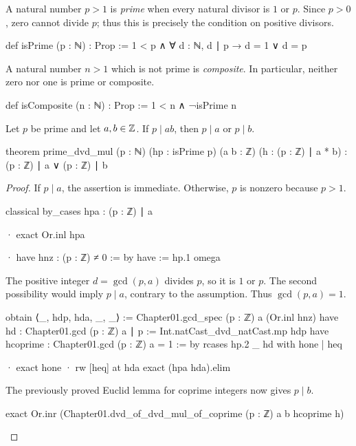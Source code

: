 \begin{definition}
  A natural number $p>1$ is \emph{prime} when every natural divisor is $1$ or $p$.
  Since $p>0$, zero cannot divide $p$; thus this is precisely the condition on positive divisors.

  \begin{lean}
    def isPrime (p : ℕ) : Prop :=
      1 < p ∧ ∀ d : ℕ, d ∣ p → d = 1 ∨ d = p
  \end{lean}
\end{definition}

\begin{definition}
  A natural number $n>1$ which is not prime is \emph{composite}.
  In particular, neither zero nor one is prime or composite.

  \begin{lean}
    def isComposite (n : ℕ) : Prop :=
      1 < n ∧ ¬isPrime n
  \end{lean}
\end{definition}

\begin{theorem}
  \label{ent:thm:prime-divides-product}
  Let $p$ be prime and let $a,b\in\mathbb{Z}$.
  If $p\mid ab$, then $p\mid a$ or $p\mid b$.

  \begin{lean}
    theorem prime_dvd_mul (p : ℕ) (hp : isPrime p) (a b : ℤ)
        (h : (p : ℤ) ∣ a * b) : (p : ℤ) ∣ a ∨ (p : ℤ) ∣ b
  \end{lean}
\end{theorem}

\begin{proof}
  If $p\mid a$, the assertion is immediate.
  Otherwise, $p$ is nonzero because $p>1$.

  \begin{lean}
    classical
    by_cases hpa : (p : ℤ) ∣ a

    · exact Or.inl hpa

    · have hnz : (p : ℤ) ≠ 0 := by
        have := hp.1
        omega
  \end{lean}

  The positive integer $d=\gcd(p,a)$ divides $p$, so it is $1$ or $p$.
  The second possibility would imply $p\mid a$, contrary to the assumption.
  Thus $\gcd(p,a)=1$.

  \begin{lean}
    obtain ⟨_, hdp, hda, _, _⟩ := Chapter01.gcd_spec (p : ℤ) a (Or.inl hnz)
    have hd : Chapter01.gcd (p : ℤ) a ∣ p := Int.natCast_dvd_natCast.mp hdp
    have hcoprime : Chapter01.gcd (p : ℤ) a = 1 := by
      rcases hp.2 _ hd with hone | heq

      · exact hone
      · rw [heq] at hda
        exact (hpa hda).elim
  \end{lean}

  The previously proved Euclid lemma for coprime integers now gives $p\mid b$.

  \begin{lean}
    exact Or.inr (Chapter01.dvd_of_dvd_mul_of_coprime (p : ℤ) a b hcoprime h)
  \end{lean}

\end{proof}

